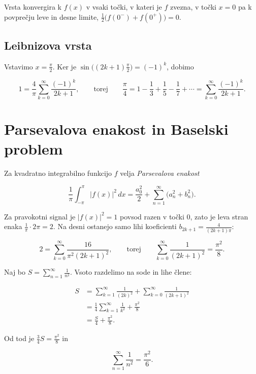 \documentclass[a4paper]{article}
\begin{document}
Vrsta konvergira k \(f(x)\) v vsaki točki, v kateri je \(f\) zvezna, v
točki \(x = 0\) pa k povprečju leve in desne limite,
\(\frac{1}{2} \bigl( f(0^-) + f(0^+) \bigr) = 0\).

\subsection{Leibnizova vrsta}\label{leibnizova-vrsta}

Vstavimo \(x = \frac{\pi}{2}\). Ker je
\(\sin\bigl((2k + 1)\frac{\pi}{2}\bigr) = (-1)^k\), dobimo

\[1 = \frac{4}{\pi} \sum_{k=0}^{\infty} \frac{(-1)^k}{2k + 1}, \qquad \text{torej} \qquad \frac{\pi}{4} = 1 - \frac{1}{3} + \frac{1}{5} - \frac{1}{7} + \cdots = \sum_{k=0}^{\infty} \frac{(-1)^k}{2k + 1}.\]

\section{Parsevalova enakost in Baselski
problem}\label{parsevalova-enakost-in-baselski-problem}

Za kvadratno integrabilno funkcijo \(f\) velja \emph{Parsevalova
enakost}

\[\frac{1}{\pi} \int_{-\pi}^{\pi} \lvert f(x) \rvert^2 \, dx = \frac{a_0^2}{2} + \sum_{n=1}^{\infty} \bigl( a_n^2 + b_n^2 \bigr).\]

Za pravokotni signal je \(\lvert f(x) \rvert^2 = 1\) povsod razen v
točki \(0\), zato je leva stran enaka \(\frac{1}{\pi} \cdot 2\pi = 2\).
Na desni ostanejo samo lihi koeficienti
\(b_{2k+1} = \frac{4}{(2k + 1)\pi}\):

\[2 = \sum_{k=0}^{\infty} \frac{16}{\pi^2 (2k + 1)^2}, \qquad \text{torej} \qquad \sum_{k=0}^{\infty} \frac{1}{(2k + 1)^2} = \frac{\pi^2}{8}.\]

Naj bo \(S = \sum_{n=1}^{\infty} \frac{1}{n^2}\). Vsoto razdelimo na
sode in lihe člene:

\[\begin{aligned}
S &= \sum_{k=1}^{\infty} \frac{1}{(2k)^2} + \sum_{k=0}^{\infty} \frac{1}{(2k + 1)^2} \\
&= \frac{1}{4} \sum_{k=1}^{\infty} \frac{1}{k^2} + \frac{\pi^2}{8} \\
&= \frac{S}{4} + \frac{\pi^2}{8}.
\end{aligned}\]

Od tod je \(\frac{3}{4} S = \frac{\pi^2}{8}\) in

\[\boxed{\sum_{n=1}^{\infty} \frac{1}{n^2} = \frac{\pi^2}{6}.}\]
\end{document}
